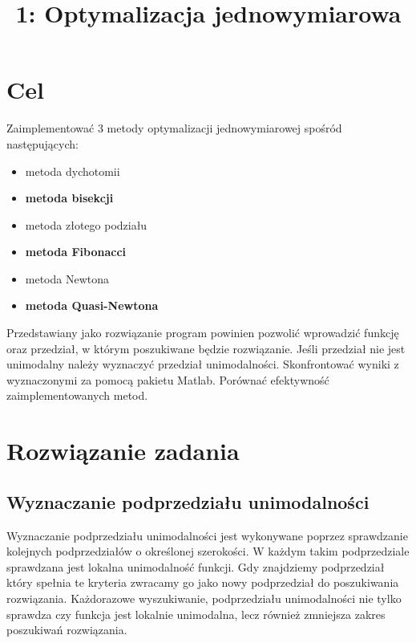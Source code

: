 \documentclass{classrep}
\author{
  \studentinfo{Paweł Musiał}{nr albumu 1} \and
  \studentinfo{Łukasz Michalski}{nr albumu 2}
}
\title{1: Optymalizacja jednowymiarowa} %
\begin{document}
\maketitle

\section{Cel}
Zaimplementować 3 metody optymalizacji jednowymiarowej spośród następujących:
\begin{itemize}
	\item	metoda dychotomii
	\item	\textbf{metoda bisekcji}
	\item	metoda złotego podziału
	\item	\textbf{metoda Fibonacci}
	\item	metoda Newtona
	\item	\textbf{metoda Quasi-Newtona}
\end{itemize}
Przedstawiany jako rozwiązanie program powinien pozwolić wprowadzić funkcję oraz przedział, w którym poszukiwane będzie rozwiązanie. Jeśli przedział nie jest unimodalny należy wyznaczyć przedział unimodalności. Skonfrontować wyniki z wyznaczonymi za pomocą pakietu Matlab. Porównać efektywność zaimplementowanych metod.
\section{Rozwiązanie zadania}

\subsection{Wyznaczanie podprzedziału unimodalności}
Wyznaczanie podprzedziału unimodalności jest wykonywane poprzez sprawdzanie kolejnych podprzedziałów o określonej szerokości. W każdym takim podprzedziale sprawdzana jest lokalna unimodalność funkcji. Gdy znajdziemy podprzedział który spełnia te kryteria zwracamy go jako nowy podprzedział do poszukiwania rozwiązania. Każdorazowe wyszukiwanie, podprzedziału unimodalności nie tylko sprawdza czy funkcja jest lokalnie unimodalna, lecz również zmniejsza zakres poszukiwań rozwiązania.
\end{document}
